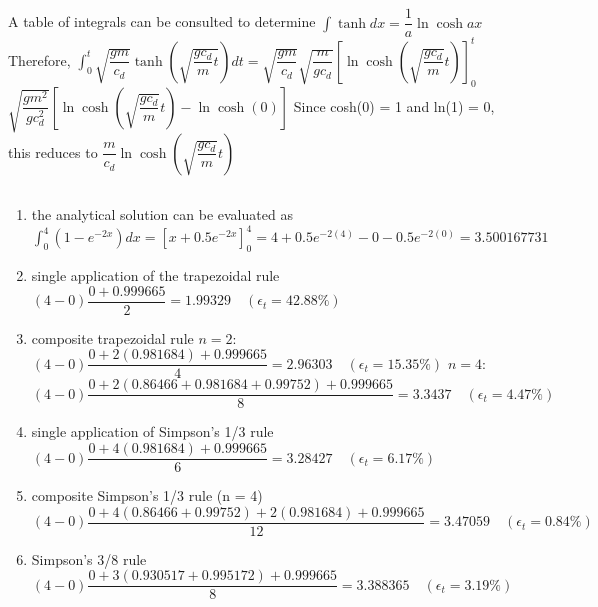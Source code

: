 \documentclass[../main.tex]{subfiles}
\begin{document}
\chapter{}
\label{cha:cha_16}

\section{}
A table of integrals can be consulted to determine
	\bigbreak
$\displaystyle\int \tanh d x=\dfrac{1}{a} \ln \cosh a x$
	\bigbreak
Therefore,
	\bigbreak
$\displaystyle\int_{0}^{t} \sqrt{\dfrac{g m}{c_{d}}} \tanh \left(\sqrt{\dfrac{g c_{d}}{m} t}\right) d t=\sqrt{\dfrac{g m}{c_{d}}} \sqrt{\dfrac{m}{g c_{d}}}\left[\operatorname { l n } \operatorname { c o s h } \left(\sqrt{\dfrac{g c_{d}}{m}} t\right)\right]^{t}_{0}$
	\bigbreak
$\sqrt{\dfrac{g m^{2}}{g c_{d}^{2}}}\left[\ln \cosh \left(\sqrt{\dfrac{g c_{d}}{m}} t\right)-\ln \cosh (0)\right]$
	\bigbreak
Since cosh(0) = 1 and ln(1) = 0, this reduces to
	\bigbreak
$\dfrac{m}{c_{d}} \ln \cosh \left(\sqrt{\dfrac{g c_{d}}{m}} t\right)$
	\bigbreak



\section{}
\begin{enumerate}[label=\bfseries(\alph*)]
\item the analytical solution can be evaluated as
	\bigbreak
$\displaystyle\int_{0}^{4}\left(1-e^{-2 x}\right) d x=\left[x+0.5 e^{-2 x}\right]_{0}^{4}=4+0.5 e^{-2(4)}-0-0.5 e^{-2(0)}=3.500167731$
	\bigbreak
\item single application of the trapezoidal rule 
	\bigbreak
$(4-0) \dfrac{0+0.999665}{2}=1.99329 \quad\left(\epsilon_{t}=42.88 \%\right)$
	\bigbreak
\item composite trapezoidal rule
	\bigbreak
$n=2:$
	\bigbreak
$(4-0) \dfrac{0+2(0.981684)+0.999665}{4}=2.96303 \quad\left(\epsilon_{t}=15.35 \%\right)$
	\bigbreak
$n=4:$
	\bigbreak
$(4-0) \dfrac{0+2(0.86466+0.981684+0.99752)+0.999665}{8}=3.3437 \quad\left(\epsilon_{t}=4.47 \%\right)$
	\bigbreak
\item single application of Simpson’s 1/3 rule 
	\bigbreak
$(4-0) \dfrac{0+4(0.981684)+0.999665}{6}=3.28427 \quad\left(\epsilon_{t}=6.17 \%\right)$
	\bigbreak
\item composite Simpson’s 1/3 rule (n = 4) 
	\bigbreak
$(4-0) \dfrac{0+4(0.86466+0.99752)+2(0.981684)+0.999665}{12}=3.47059 \quad\left(\epsilon_{t}=0.84 \%\right)$
	\bigbreak
\item Simpson’s 3/8 rule
	\bigbreak
$(4-0) \dfrac{0+3(0.930517+0.995172)+0.999665}{8}=3.388365 \quad\left(\epsilon_{t}=3.19 \%\right)$
	\bigbreak
\end{enumerate}
\end{document}
